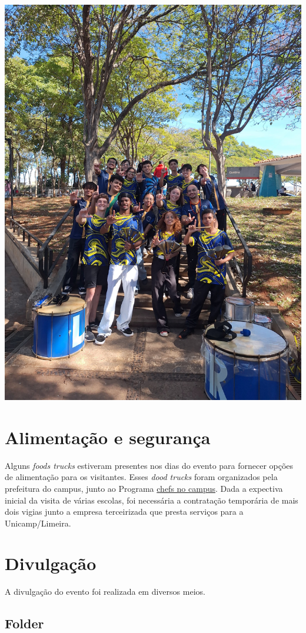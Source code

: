 \documentclass[
  letterpaper,
  DIV=11,
  numbers=noendperiod]{scrreprt}
\begin{document}
\includegraphics[width=0.7\linewidth,height=\textheight,keepaspectratio]{planejamento/limeteria.jpg}

\section{Alimentação e
segurança}\label{alimentauxe7uxe3o-e-seguranuxe7a}

Alguns \emph{foods trucks} estiveram presentes nos dias do evento para
fornecer opções de alimentação para os visitantes. Esses \emph{dood
trucks} foram organizados pela prefeitura do campus, junto ao Programa
\href{https://prefeituralimeira.unicamp.br/chefs-no-campus/}{chefs no
campus}. Dada a expectiva inicial da visita de várias escolas, foi
necessária a contratação temporária de mais dois vigias junto a empresa
terceirizada que presta serviços para a Unicamp/Limeira.

\section{Divulgação}\label{divulgauxe7uxe3o}

A divulgação do evento foi realizada em diversos meios.

\subsection{Folder}\label{folder}
\end{document}
